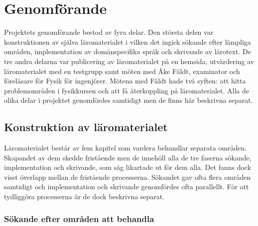 



\chapter{Genomförande}

Projektets genomförande bestod av fyra delar. Den största delen var
konstruktionen av själva läromaterialet i vilken det ingick sökande efter lämpliga
områden, implementation av domänspecifika språk och skrivande av lärotext. De
tre andra delarna var publicering av läromaterialet på en hemsida, utvärdering
av läromaterialet med en testgrupp samt möten med Åke Fäldt, examinator och
föreläsare för Fysik för ingenjörer. Mötena med Fäldt hade två syften: att hitta
problemområden i fysikkursen och att få återkoppling på läromaterialet. Alla de
olika delar i projektet genomfördes samtidigt men de finns här beskrivna
separat.

\section{Konstruktion av läromaterialet}\label{sec:konstruktion}

Läromaterialet består av fem kapitel som vardera behandlar separata områden.
Skapandet av dem skedde fristående men de innehöll alla de tre faserna sökande,
implementation och skrivande, som såg likartade ut för dem alla. Det fanns dock
visst överlapp mellan de fristående processerna. Sökandet gav ofta flera områden
samtidigt och implementation och skrivande genomfördes ofta parallellt. För att
tydliggöra processerna är de dock beskrivna separat.

\subsection{Sökande efter områden att behandla}\label{sec:valet}

